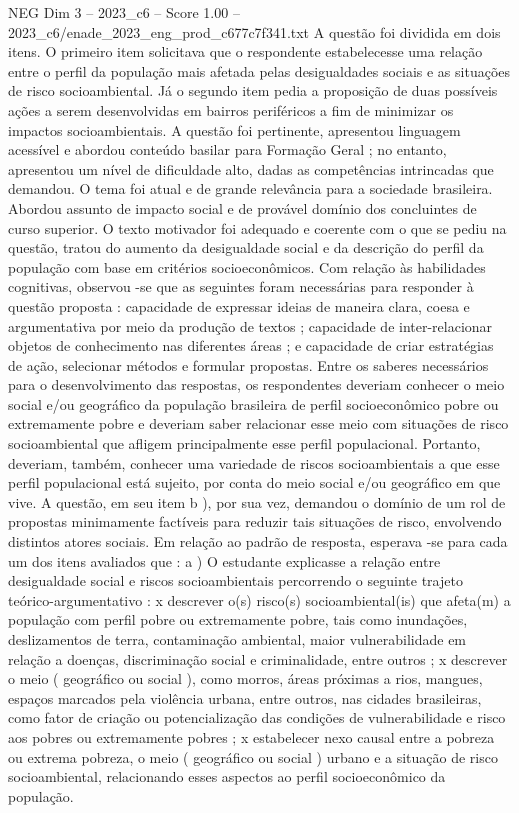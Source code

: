 \begin{textsample}{NEG Dim 3 – 2023\_c6 – Score 1.00 – 2023\_c6/enade\_2023\_eng\_prod\_c677c7f341.txt}
A questão foi dividida em dois itens.
O primeiro item solicitava que o respondente estabelecesse uma relação entre o perfil da população mais afetada pelas desigualdades sociais e as situações de risco socioambiental.
Já o segundo item pedia a proposição de duas possíveis ações a serem desenvolvidas em bairros periféricos a fim de minimizar os impactos socioambientais.
A questão foi pertinente, apresentou linguagem acessível e abordou conteúdo basilar para Formação Geral ; no entanto, apresentou um nível de dificuldade alto, dadas as competências intrincadas que demandou.
O tema foi atual e de grande relevância para a sociedade brasileira.
Abordou assunto de impacto social e de provável domínio dos concluintes de curso superior.
O texto motivador foi adequado e coerente com o que se pediu na questão, tratou do aumento da desigualdade social e da descrição do perfil da população com base em critérios socioeconômicos.
Com relação às habilidades cognitivas, observou -se que as seguintes foram necessárias para responder à questão proposta : capacidade de expressar ideias de maneira clara, coesa e argumentativa por meio da produção de textos ; capacidade de inter-relacionar objetos de conhecimento nas diferentes áreas ; e capacidade de criar estratégias de ação, selecionar métodos e formular propostas.
Entre os saberes necessários para o desenvolvimento das respostas, os respondentes deveriam conhecer o meio social e/ou geográfico da população brasileira de perfil socioeconômico pobre ou extremamente pobre e deveriam saber relacionar esse meio com situações de risco socioambiental que afligem principalmente esse perfil populacional.
Portanto, deveriam, também, conhecer uma variedade de riscos socioambientais a que esse perfil populacional está sujeito, por conta do meio social e/ou geográfico em que vive.
A questão, em seu item b ), por sua vez, demandou o domínio de um rol de propostas minimamente factíveis para reduzir tais situações de risco, envolvendo distintos atores sociais.
Em relação ao padrão de resposta, esperava -se para cada um dos itens avaliados que : a ) O estudante explicasse a relação entre desigualdade social e riscos socioambientais percorrendo o seguinte trajeto teórico-argumentativo : x descrever o(s) risco(s) socioambiental(is) que afeta(m) a população com perfil pobre ou extremamente pobre, tais como inundações, deslizamentos de terra, contaminação ambiental, maior vulnerabilidade em relação a doenças, discriminação social e criminalidade, entre outros ; x descrever o meio ( geográfico ou social ), como morros, áreas próximas a rios, mangues, espaços marcados pela violência urbana, entre outros, nas cidades brasileiras, como fator de criação ou potencialização das condições de vulnerabilidade e risco aos pobres ou extremamente pobres ; x estabelecer nexo causal entre a pobreza ou extrema pobreza, o meio ( geográfico ou social ) urbano e a situação de risco socioambiental, relacionando esses aspectos ao perfil socioeconômico da população.

\end{textsample}
